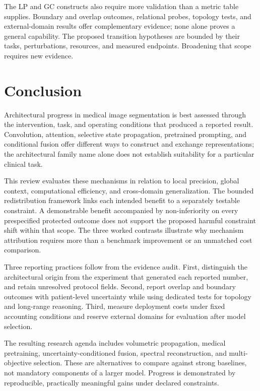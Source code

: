 \documentclass[5p,times,authoryear]{elsarticle}
\begin{document}
The LP and GC constructs also require more validation than a metric table supplies. Boundary and overlap outcomes, relational probes, topology tests, and external-domain results offer complementary evidence; none alone proves a general capability. The proposed transition hypotheses are bounded by their tasks, perturbations, resources, and measured endpoints. Broadening that scope requires new evidence.

\section{Conclusion}

Architectural progress in medical image segmentation is best assessed through the intervention, task, and operating conditions that produced a reported result. Convolution, attention, selective state propagation, pretrained prompting, and conditional fusion offer different ways to construct and exchange representations; the architectural family name alone does not establish suitability for a particular clinical task.

This review evaluates these mechanisms in relation to local precision, global context, computational efficiency, and cross-domain generalization. The bounded redistribution framework links each intended benefit to a separately testable constraint. A demonstrable benefit accompanied by non-inferiority on every prespecified protected outcome does not support the proposed harmful constraint shift within that scope. The three worked contrasts illustrate why mechanism attribution requires more than a benchmark improvement or an unmatched cost comparison.

Three reporting practices follow from the evidence audit. First, distinguish the architectural origin from the experiment that generated each reported number, and retain unresolved protocol fields. Second, report overlap and boundary outcomes with patient-level uncertainty while using dedicated tests for topology and long-range reasoning. Third, measure deployment costs under fixed accounting conditions and reserve external domains for evaluation after model selection.

The resulting research agenda includes volumetric propagation, medical pretraining, uncertainty-conditioned fusion, spectral reconstruction, and multi-objective selection. These are alternatives to compare against strong baselines, not mandatory components of a larger model. Progress is demonstrated by reproducible, practically meaningful gains under declared constraints.
\end{document}
